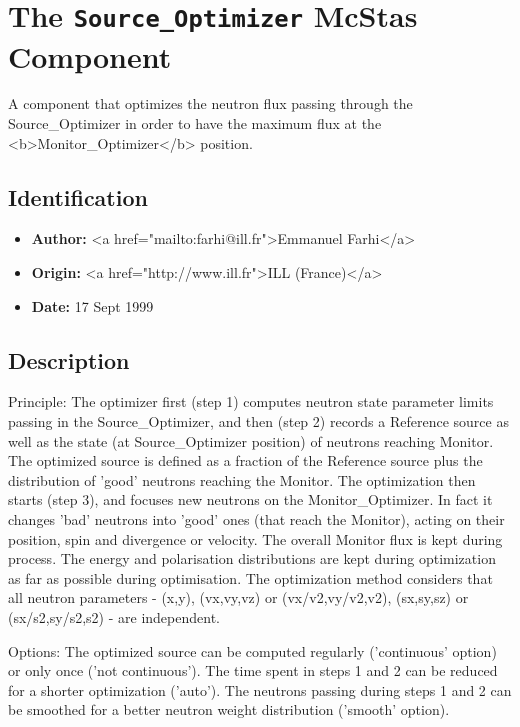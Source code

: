 \section{The \texttt{Source\_Optimizer} McStas Component}
A component that optimizes the neutron flux passing through the
Source\_Optimizer in order to have the maximum flux at the
\textless{}b\textgreater{}Monitor\_Optimizer\textless{}/b\textgreater{} position.

\subsection*{Identification}
\begin{itemize}
  \item \textbf{Author:} \textless{}a href="mailto:farhi@ill.fr"\textgreater{}Emmanuel Farhi\textless{}/a\textgreater{}
  \item \textbf{Origin:} \textless{}a href="http://www.ill.fr"\textgreater{}ILL (France)\textless{}/a\textgreater{}
  \item \textbf{Date:} 17 Sept 1999
\end{itemize}

\subsection*{Description}
Principle: The optimizer first (step 1) computes neutron state parameter limits passing in the Source\_Optimizer, and then (step 2) records a Reference source as well as the state (at Source\_Optimizer position) of neutrons reaching Monitor. The optimized source is defined as a fraction of the Reference source plus the distribution of 'good' neutrons reaching the Monitor. The optimization then starts (step 3), and focuses new neutrons on the Monitor\_Optimizer. In fact it changes 'bad' neutrons into 'good' ones (that reach the Monitor), acting on their position, spin and divergence or velocity. The overall Monitor flux is kept during process. The energy and polarisation distributions are kept during optimization as far as possible during optimisation. The optimization method considers that all neutron parameters - (x,y), (vx,vy,vz) or (vx/v2,vy/v2,v2), (sx,sy,sz) or (sx/s2,sy/s2,s2) - are independent.

Options: The optimized source can be computed regularly ('continuous' option) or only once ('not continuous'). The time spent in steps 1 and 2 can be reduced for a shorter optimization ('auto'). The neutrons passing during steps 1 and 2 can be smoothed for a better neutron weight distribution ('smooth' option).

